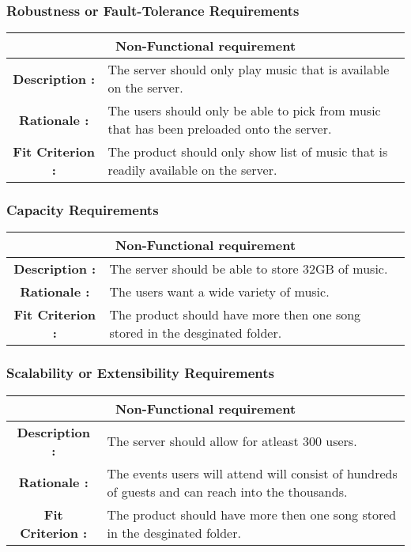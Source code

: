 \documentclass[12pt, titlepage]{article}
\begin{document}
\subsubsection{Robustness or Fault-Tolerance Requirements}
\begin{center}
\begin{table}[H]
\begin{tabularx}{\textwidth}{| c X |}
\hline
\multicolumn{2}{|c|}{\textbf{Non-Functional requirement}}\\
\hline 
\textbf{Description : } & The server should only play music that is available on the server.\\ 
\hline 
\textbf{Rationale : } & The users should only be able to pick from music that has been preloaded onto the server. \\
\hline
\textbf{Fit Criterion : } & The product should only show list of music that is readily available on the server. \\
\hline
\end{tabularx}
\end{table}
\end{center}
\subsubsection{Capacity Requirements}
\begin{center}
\begin{table}[H]
\begin{tabularx}{\textwidth}{| c X |}
\hline
\multicolumn{2}{|c|}{\textbf{Non-Functional requirement}}\\
\hline 
\textbf{Description : } & The server should be able to store 32GB of music.\\ 
\hline 
\textbf{Rationale : } & The users want a wide variety of music. \\
\hline
\textbf{Fit Criterion : } & The product should have more then one song stored in the desginated folder. \\
\hline
\end{tabularx}
\end{table}
\end{center}
\subsubsection{Scalability or Extensibility Requirements}
\begin{center}
\begin{table}[H]
\begin{tabularx}{\textwidth}{| c X |}
\hline
\multicolumn{2}{|c|}{\textbf{Non-Functional requirement}}\\
\hline 
\textbf{Description : } &The server should allow for atleast 300 users.\\ 
\hline 
\textbf{Rationale : } &The events users will attend will consist of hundreds of guests and can reach into the thousands. \\
\hline
\textbf{Fit Criterion : } & The product should have more then one song stored in the desginated folder. \\
\hline
\end{tabularx}
\end{table}
\end{center}
\end{document}
